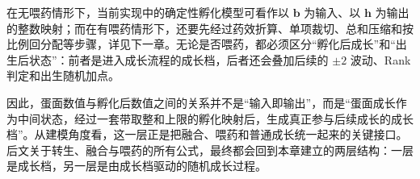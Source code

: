 在无喂药情形下，当前实现中的确定性孵化模型可看作以 $\bm{b}$ 为输入、以 $\bm{h}$ 为输出的整数映射；而在有喂药情形下，还要先经过药效折算、单项裁切、总和压缩和按比例回分配等步骤，详见下一章。无论是否喂药，都必须区分“孵化后成长”和“出生后状态”：前者是进入成长流程的成长档，后者还会叠加后续的 $\pm2$ 波动、Rank 判定和出生随机加点。

因此，蛋面数值与孵化后数值之间的关系并不是“输入即输出”，而是“蛋面成长作为中间状态，经过一套带取整和上限的孵化映射后，生成真正参与后续成长的成长档”。从建模角度看，这一层正是把融合、喂药和普通成长统一起来的关键接口。后文关于转生、融合与喂药的所有公式，最终都会回到本章建立的两层结构：一层是成长档，另一层是由成长档驱动的随机成长过程。
